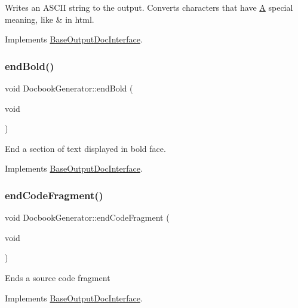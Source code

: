 Writes an A\+S\+C\+II string to the output. Converts characters that have \mbox{\hyperlink{class_a}{A}} special meaning, like {\ttfamily \&} in html. 

Implements \mbox{\hyperlink{class_base_output_doc_interface_ad7d3f6631bd157739170690e669b3e75}{Base\+Output\+Doc\+Interface}}.

\mbox{\label{class_docbook_generator_a798fe205e0beedacd6c035c865ae354c}} 
\subsubsection{\texorpdfstring{endBold()}{endBold()}}
{\footnotesize\ttfamily void Docbook\+Generator\+::end\+Bold (\begin{DoxyParamCaption}\item[{void}]{ }\end{DoxyParamCaption})\hspace{0.3cm}{\ttfamily [virtual]}}

End a section of text displayed in bold face. 

Implements \mbox{\hyperlink{class_base_output_doc_interface_a2a17911ba778f8efac83999fb5d190d9}{Base\+Output\+Doc\+Interface}}.

\mbox{\label{class_docbook_generator_a5f6585ebe5d203c47bb25cefdd30d8fd}} 
\subsubsection{\texorpdfstring{endCodeFragment()}{endCodeFragment()}}
{\footnotesize\ttfamily void Docbook\+Generator\+::end\+Code\+Fragment (\begin{DoxyParamCaption}\item[{void}]{ }\end{DoxyParamCaption})\hspace{0.3cm}{\ttfamily [virtual]}}

Ends a source code fragment 

Implements \mbox{\hyperlink{class_base_output_doc_interface_a08f032482a8f23ac1aab66552db43a81}{Base\+Output\+Doc\+Interface}}.

